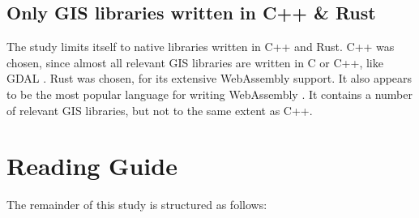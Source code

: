 
 
\subsection*{Only GIS libraries written in C++ \& Rust}

The study limits itself to native libraries written in C++ and Rust. 
C++ was chosen, since almost all relevant GIS libraries are written in C or C++, like GDAL \citep{dohler_gdal_2022}. 
Rust was chosen, for its extensive WebAssembly support. 
It also appears to be the most popular language for writing WebAssembly \citep{eberhardt_state_2022}.
It contains a number of relevant GIS libraries, but not to the same extent as C++.


\section{Reading Guide}
The remainder of this study is structured as follows:

